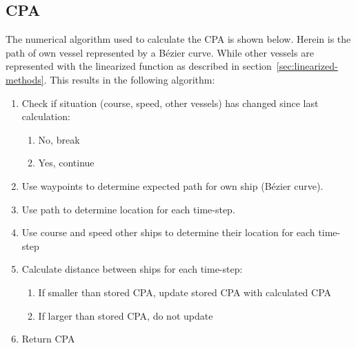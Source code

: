 \subsection{\acf{CPA}}
The numerical algorithm used to calculate the CPA is shown below. Herein is the path of own vessel represented by a Bézier curve. While other vessels are represented with the linearized function as described in section~\ref{sec:linearized-methods}. This results in the following algorithm:
\begin{enumerate}
	\item Check if situation (course, speed, other vessels) has changed since last calculation:
	\begin{enumerate}
		\item No, break
		\item Yes, continue
	\end{enumerate}
	\item Use waypoints to determine expected path for own ship (Bézier curve).
	\item Use path to determine location for each time-step.
	\item Use course and speed other ships to determine their location for each time-step
	\item Calculate distance between ships for each time-step:
	\begin{enumerate}
		\item If smaller than stored CPA, update stored CPA with calculated CPA
		\item If larger than stored CPA, do not update
	\end{enumerate}
	\item Return CPA
\end{enumerate}

